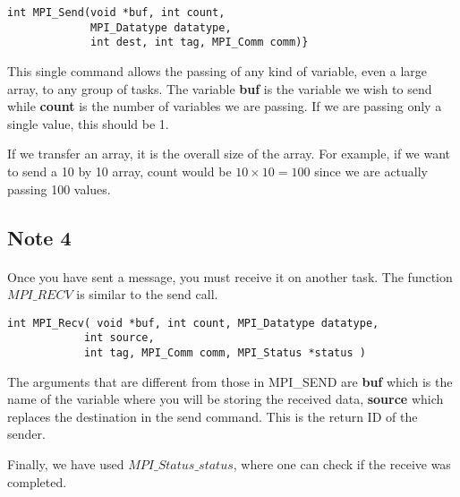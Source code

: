 \begin{verbatim}
int MPI_Send(void *buf, int count, 
             MPI_Datatype datatype, 
             int dest, int tag, MPI_Comm comm)}

\end{verbatim}

This single command allows the passing of any kind of variable, even a large array, to any group of tasks. 
The variable \textbf{buf} is the variable we wish to send while \textbf{count}
is the  number of variables we are passing. If we are passing only a single value, this should be 1. 

If we transfer an array, it is  the overall size of the array. 
For example, if we want to send a 10 by 10 array, count would be $10\times 10=100$ 
since we are  actually passing 100 values.



\subsection*{Note 4}

\paragraph{}

Once you have  sent a message, you must receive it on another task. The function $MPI\_RECV$
is similar to the send call.




\begin{verbatim}
int MPI_Recv( void *buf, int count, MPI_Datatype datatype, 
            int source, 
            int tag, MPI_Comm comm, MPI_Status *status )

\end{verbatim}


The arguments that are different from those in MPI\_SEND are
\textbf{buf} which  is the name of the variable where you will  be storing the received data, 
\textbf{source} which  replaces the destination in the send command. This is the return ID of the sender.

Finally,  we have used  $MPI\_Status\_status$,  
where one can check if the receive was completed.

